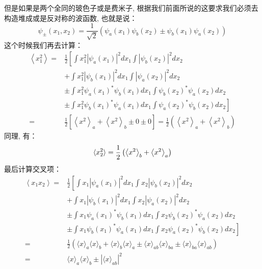 但是如果是两个全同的玻色子或是费米子, 根据我们前面所说的这要求我们必须去构造堆成或是反对称的波函数, 也就是说：
\[\psi_\pm(x_1,x_2)=\frac{1}{\sqrt{2}}\left(\psi_a(x_1)\psi_b(x_2)\pm\psi_b(x_1)\psi_a(x_2)\right)\]
这个时候我们再去计算：
\begin{equation}
   \begin{aligned}
        \left\langle x_{1}^{2}\right\rangle=& \frac{1}{2}\left[\int x_{1}^{2}\left|\psi_{a}\left(x_{1}\right)\right|^{2} d x_{1} \int\left|\psi_{b}\left(x_{2}\right)\right|^{2} d x_{2}\right.\\
        &\left.+\int x_{1}^{2}\left|\psi_{b}\left(x_{1}\right)\right|^{2} d x_{1} \int\left|\psi_{a}\left(x_{2}\right)\right|^{2} d x_{2} \right.\\
        &\left.\pm \int x_{1}^{2} \psi_{a}\left(x_{1}\right)^{*} \psi_{b}\left(x_{1}\right) d x_{1} \int \psi_{b}\left(x_{2}\right)^{*} \psi_{a}\left(x_{2}\right) d x_{2}\right. \\
        &\left.\pm \int x_{1}^{2} \psi_{b}\left(x_{1}\right)^{*} \psi_{a}\left(x_{1}\right) d x_{1} \int \psi_{a}\left(x_{2}\right)^{*} \psi_{b}\left(x_{2}\right) d x_{2}\right] \\
        =& \frac{1}{2}\left[\left\langle x^{2}\right\rangle_{a}+\left\langle x^{2}\right\rangle_{b} \pm 0 \pm 0\right]=\frac{1}{2}\left(\left\langle x^{2}\right\rangle_{a}+\left\langle x^{2}\right\rangle_{b}\right)
    \end{aligned} 
\end{equation}
同理, 有：
\begin{equation}
    \braket{x_2^2}=\frac{1}{2}\left(\left\langle x^{2}\right\rangle_{b}+\left\langle x^{2}\right\rangle_{a}\right)
\end{equation}
最后计算交叉项：
\begin{equation}
    \begin{aligned}
        \left\langle x_{1} x_{2}\right\rangle=& \frac{1}{2}\left[\int x_{1}\left|\psi_{a}\left(x_{1}\right)\right|^{2} d x_{1} \int x_{2}\left|\psi_{b}\left(x_{2}\right)\right|^{2} d x_{2}\right.\\
        &\left.+\int x_{1}\left|\psi_{b}\left(x_{1}\right)\right|^{2} d x_{1} \int x_{2}\left|\psi_{a}\left(x_{2}\right)\right|^{2} d x_{2}\right. \\
        &\left. \pm \int x_{1} \psi_{a}\left(x_{1}\right)^{*} \psi_{b}\left(x_{1}\right) d x_{1} \int x_{2} \psi_{b}\left(x_{2}\right)^{*} \psi_{a}\left(x_{2}\right) d x_{2}\right. \\
        &\left.\pm \int x_{1} \psi_{b}\left(x_{1}\right)^{*} \psi_{a}\left(x_{1}\right) d x_{1} \int x_{2} \psi_{a}\left(x_{2}\right)^{*} \psi_{b}\left(x_{2}\right) d x_{2}\right] \\
        =& \frac{1}{2}\left(\langle x\rangle_{a}\langle x\rangle_{b}+\langle x\rangle_{b}\langle x\rangle_{a} \pm\langle x\rangle_{a b}\langle x\rangle_{b a} \pm\langle x\rangle_{b a}\langle x\rangle_{a b}\right) \\
        =&\langle x\rangle_{a}\langle x\rangle_{b} \pm\left|\langle x\rangle_{a b}\right|^{2}
    \end{aligned}
\end{equation}
